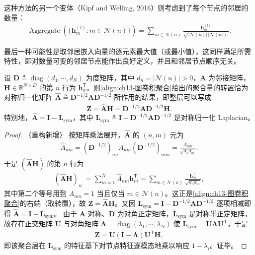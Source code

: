 \documentclass[../../main.tex]{subfiles}
\begin{document}
这种方法的另一个变体（Kipf and Welling, 2016）则考虑到了每个节点的邻居的数量：
\begin{align}
\operatorname{Aggregate}\!\left(\{\bm{h}_m^{(l)}:m\in\mathcal{N}(n)\}\right)=\sum_{m\in\mathcal{N}(n)}\frac{\bm{h}_m^{(l)}}{\sqrt{|\mathcal{N}(n)|\,|\mathcal{N}(m)|}}.
\label{align:ch13-图卷积聚合}
\end{align}

最后一种可能性是取邻居嵌入向量的逐元素最大值（或最小值），这同样满足所需特性，即对数量可变的邻居节点能作出良好定义，并且和邻居节点顺序无关。

\begin{proposition}\label{proposition:ch13-图卷积谱解释}
设 $\bm{D}\triangleq\operatorname{diag}(d_1,\cdots,d_N)$ 为度矩阵，其中 $d_n=|\mathcal{N}(n)|>0$，$\bm{A}$ 为邻接矩阵，$\bm{H}\in\mathbb{R}^{N\times D}$ 的第 $n$ 行为 $\bm{h}_n^{\mathsf T}$。则\eqref{align:ch13-图卷积聚合}给出的聚合量的转置恰为对称归一化矩阵 $\widehat{\bm{A}}\triangleq\bm{D}^{-1/2}\bm{A}\bm{D}^{-1/2}$ 所作用的结果，即整层可以写成
\begin{align*}
\bm{Z}=\widehat{\bm{A}}\bm{H}=\bm{D}^{-1/2}\bm{A}\bm{D}^{-1/2}\bm{H}.
\end{align*}
特别地，$\widehat{\bm{A}}=\bm{I}-\bm{L}_{\mathrm{sym}}$，其中 $\bm{L}_{\mathrm{sym}}\triangleq\bm{I}-\bm{D}^{-1/2}\bm{A}\bm{D}^{-1/2}$ 是对称归一化 Laplacian。
\end{proposition}

\begin{proof}（重构新增）
按矩阵乘法展开，$\widehat{\bm{A}}$ 的 $(n,m)$ 元为
\begin{align*}
\widehat{A}_{nm}=\left(\bm{D}^{-1/2}\right)_{nn}A_{nm}\left(\bm{D}^{-1/2}\right)_{mm}=\frac{A_{nm}}{\sqrt{d_n d_m}}.
\end{align*}
于是 $(\widehat{\bm{A}}\bm{H})$ 的第 $n$ 行为
\begin{align*}
\left(\widehat{\bm{A}}\bm{H}\right)_{n:}=\sum_{m=1}^{N}\widehat{A}_{nm}\bm{h}_m^{\mathsf T}=\sum_{m\in\mathcal{N}(n)}\frac{\bm{h}_m^{\mathsf T}}{\sqrt{d_n d_m}},
\end{align*}
其中第二个等号用到 $A_{nm}=1$ 当且仅当 $m\in\mathcal{N}(n)$。这正是\eqref{align:ch13-图卷积聚合}的右端（取转置），故 $\bm{Z}=\widehat{\bm{A}}\bm{H}$。又因 $\bm{L}_{\mathrm{sym}}=\bm{I}-\bm{D}^{-1/2}\bm{A}\bm{D}^{-1/2}$ 逐项相减即得 $\widehat{\bm{A}}=\bm{I}-\bm{L}_{\mathrm{sym}}$。
由于 $\bm{A}$ 对称、$\bm{D}$ 为对角正定矩阵，$\bm{L}_{\mathrm{sym}}$ 是对称半正定矩阵，故存在正交矩阵 $\bm{U}$ 与对角矩阵 $\bm{\Lambda}=\operatorname{diag}(\lambda_1,\cdots,\lambda_N)$ 使 $\bm{L}_{\mathrm{sym}}=\bm{U}\bm{\Lambda}\bm{U}^{\mathsf T}$，于是
\begin{align*}
\bm{Z}=\bm{U}\left(\bm{I}-\bm{\Lambda}\right)\bm{U}^{\mathsf T}\bm{H},
\end{align*}
即该聚合层在 $\bm{L}_{\mathrm{sym}}$ 的特征基下对节点特征逐模态地乘以响应 $1-\lambda_i$。证毕。
\end{proof}
\end{document}
